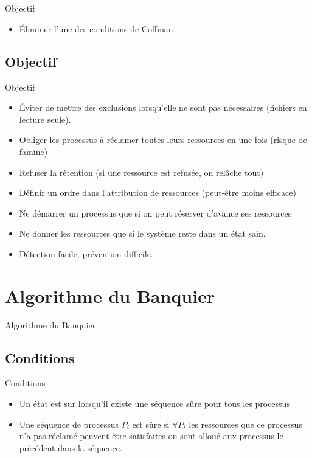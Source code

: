 \section{\sectitle}
\begin{frame}{\sectitle}
\def\subsectitle{Objectif}

\begin{alertblock}{\subsectitle}
\begin{itemize}
    \item Éliminer l'une des conditions de Coffman
\end{itemize}
\end{alertblock}


\subsection{\subsectitle}
\begin{block}{\subsectitle}
\begin{itemize}
    \item Éviter de mettre des exclusions lorsqu'elle ne sont pas nécessaires
    (fichiers en lecture seule).
    \item Obliger les processus à réclamer toutes leurs ressources en une fois
    (risque de famine)
    \item Refuser la rétention (si une ressource est refusée, on relâche tout)
    \item Définir un ordre dans l'attribution de ressources (peut-être moins
    efficace)
    \item Ne démarrer un processus que si on peut réserver d'avance ses
    ressources
    \item Ne donner les ressources que si le système reste dans un état sain.
    \item Détection facile, prévention difficile.
\end{itemize}
\end{block}
\end{frame}


\def\sectitle{Algorithme du Banquier}
\section{\sectitle}
\begin{frame}{\sectitle}
\def\subsectitle{Conditions}
\subsection{\subsectitle}
\begin{block}{\subsectitle}
\begin{itemize}
    \item Un état est sur lorsqu'il existe une séquence sûre pour tous les
    processus
    \item Une séquence de processus $P_{i}$ est sûre si $\forall P_{i}$ les
    ressources que ce processus n'a pas réclamé peuvent être satisfaites ou sont
    alloué aux processus le précédent dans la séquence.
\end{itemize}
\end{block}
\end{frame}

